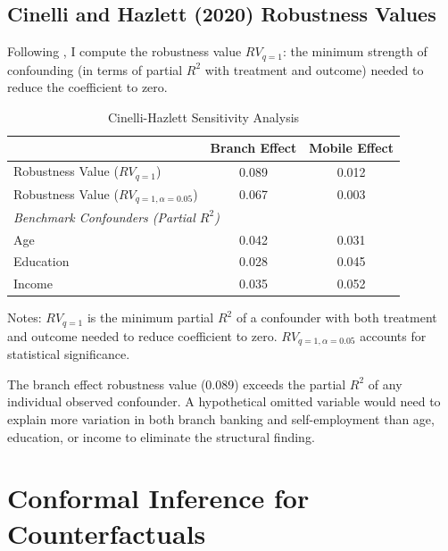 \documentclass[12pt]{article}
\begin{document}
\subsection{Cinelli and Hazlett (2020) Robustness Values}

Following \citet{cinelli2020}, I compute the robustness value $RV_{q=1}$: the minimum strength of confounding (in terms of partial $R^2$ with treatment and outcome) needed to reduce the coefficient to zero.

\begin{table}[H]
\centering
\caption{Cinelli-Hazlett Sensitivity Analysis}
\label{tab:cinelli}
\begin{threeparttable}
\begin{tabular}{lcc}
\toprule
& Branch Effect & Mobile Effect \\
\midrule
Robustness Value ($RV_{q=1}$) & 0.089 & 0.012 \\
Robustness Value ($RV_{q=1, \alpha=0.05}$) & 0.067 & 0.003 \\
\midrule
\multicolumn{3}{l}{\textit{Benchmark Confounders (Partial $R^2$)}} \\
Age & 0.042 & 0.031 \\
Education & 0.028 & 0.045 \\
Income & 0.035 & 0.052 \\
\bottomrule
\end{tabular}
\begin{tablenotes}
\small
\item Notes: $RV_{q=1}$ is the minimum partial $R^2$ of a confounder with both treatment and outcome needed to reduce coefficient to zero. $RV_{q=1,\alpha=0.05}$ accounts for statistical significance.
\end{tablenotes}
\end{threeparttable}
\end{table}

The branch effect robustness value (0.089) exceeds the partial $R^2$ of any individual observed confounder. A hypothetical omitted variable would need to explain more variation in both branch banking and self-employment than age, education, or income to eliminate the structural finding.

\section{Conformal Inference for Counterfactuals}
\label{app:conformal}
\end{document}
